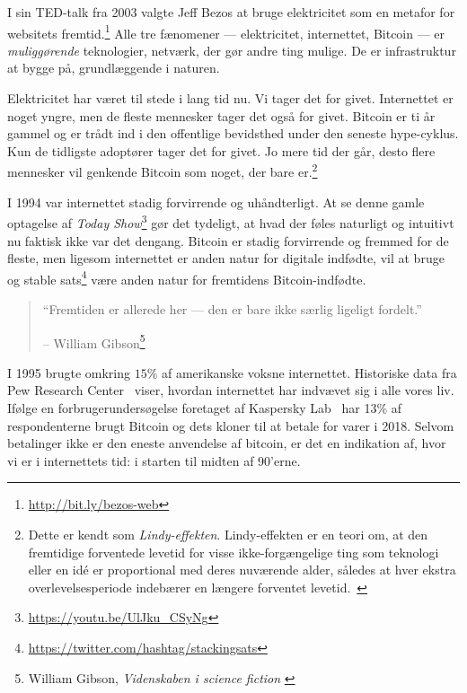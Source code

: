 I sin TED-talk fra 2003 valgte Jeff Bezos at bruge elektricitet som en metafor
for websitets fremtid.\footnote{\url{http://bit.ly/bezos-web}} Alle tre 
fænomener --- elektricitet, internettet, Bitcoin --- er \textit{muliggørende} 
teknologier, netværk, der gør andre ting mulige. De er infrastruktur at bygge 
på, grundlæggende i naturen.

Elektricitet har været til stede i lang tid nu. Vi tager det for givet. 
Internettet er noget yngre, men de fleste mennesker tager det også for givet. 
Bitcoin er ti år gammel og er trådt ind i den offentlige bevidsthed under den 
seneste hype-cyklus. Kun de tidligste adoptører tager det for givet. Jo mere 
tid der går, desto flere mennesker vil genkende Bitcoin som noget, der bare 
er.\footnote{Dette er kendt som \textit{Lindy-effekten}. Lindy-effekten er 
en teori om, at den fremtidige forventede levetid for visse ikke-forgængelige 
ting som teknologi eller en idé er proportional med deres nuværende alder, 
således at hver ekstra overlevelsesperiode indebærer en længere forventet 
levetid.~\cite{wiki:lindy}}

I 1994 var internettet stadig forvirrende og uhåndterligt. At se denne gamle 
optagelse af \textit{Today Show}\footnote{\url{https://youtu.be/UlJku_CSyNg}} 
gør det tydeligt, at hvad der føles naturligt og intuitivt nu faktisk ikke 
var det dengang. Bitcoin er stadig forvirrende og fremmed for de fleste, 
men ligesom internettet er anden natur for digitale indfødte, vil at bruge 
og stable sats\footnote{\url{https://twitter.com/hashtag/stackingsats}} 
være anden natur for fremtidens Bitcoin-indfødte.

\begin{quotation}\begin{samepage}
\enquote{Fremtiden er allerede her --- den er bare ikke særlig ligeligt fordelt.}
\begin{flushright} -- William Gibson\footnote{William Gibson, 
  \textit{Videnskaben i science fiction} \cite{william-gibson}}
\end{flushright}\end{samepage}\end{quotation}

I 1995 brugte omkring $15\%$ af amerikanske voksne internettet. Historiske 
data fra Pew Research Center~\cite{pew-research} viser, hvordan internettet 
har indvævet sig i alle vores liv. Ifølge en forbrugerundersøgelse foretaget 
af Kaspersky Lab~\cite{web:kaspersky} har 13\% af respondenterne brugt 
Bitcoin og dets kloner til at betale for varer i 2018. Selvom betalinger 
ikke er den eneste anvendelse af bitcoin, er det en indikation af, hvor vi 
er i internettets tid: i starten til midten af 90'erne.

